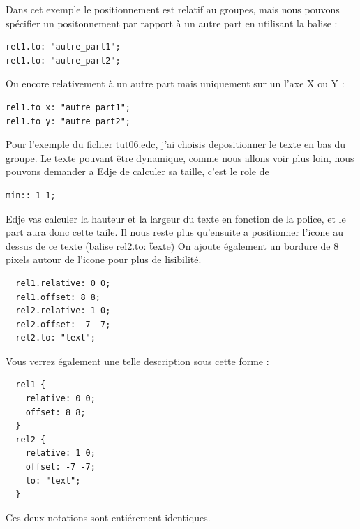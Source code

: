 \documentclass[a4paper]{efr}
\begin{document}
Dans cet exemple le positionnement est relatif au groupes, mais nous pouvons
spécifier un positonnement par rapport à un autre part en utilisant la balise : 

\begin{lstlisting}
rel1.to: "autre_part1";
rel1.to: "autre_part2";
\end{lstlisting}

Ou encore relativement à un autre part mais uniquement sur un l'axe X ou Y : 
\begin{lstlisting}
rel1.to_x: "autre_part1";
rel1.to_y: "autre_part2";
\end{lstlisting}


Pour l'exemple du fichier tut06.edc, j'ai choisis depositionner le texte en bas
du groupe. Le texte pouvant être dynamique, comme nous allons voir plus loin,
nous pouvons demander a Edje de calculer sa taille, c'est le role de 
\begin{lstlisting}
min:: 1 1;
\end{lstlisting}

Edje vas calculer la  hauteur et la largeur du texte en fonction de la police,
et le part aura donc cette taile. Il nous reste plus qu'ensuite a positionner
l'icone au dessus de ce texte (balise rel2.to: \"texte\")
On ajoute également un bordure de 8 pixels autour de l'icone pour plus de
lisibilité.
\begin{lstlisting}
  rel1.relative: 0 0;
  rel1.offset: 8 8;
  rel2.relative: 1 0;
  rel2.offset: -7 -7;
  rel2.to: "text";
\end{lstlisting}

Vous verrez également une telle description sous cette forme :
\begin{lstlisting}
  rel1 {
    relative: 0 0;
    offset: 8 8;
  }
  rel2 {
    relative: 1 0;
    offset: -7 -7;
    to: "text";
  }
\end{lstlisting}

Ces deux notations sont entiérement identiques.
\end{document}
